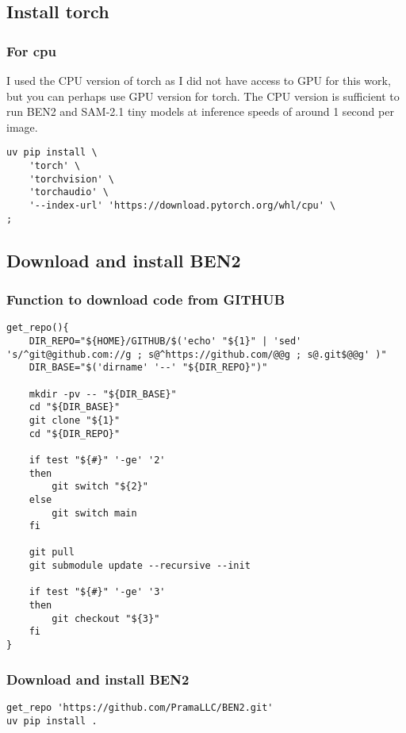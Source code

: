 \documentclass[11pt]{article}
\begin{document}
\subsection{Install torch}
\label{sec:orgc1575ae}

\subsubsection{For cpu}
\label{sec:org27c2f16}
I used the CPU version of torch as I did not have access to GPU for this work,
but you can perhaps use GPU version for torch.
The CPU version is sufficient to run BEN2 and SAM-2.1 tiny models
at inference speeds of around 1 second per image.

\begin{verbatim}
uv pip install \
    'torch' \
    'torchvision' \
    'torchaudio' \
    '--index-url' 'https://download.pytorch.org/whl/cpu' \
;
\end{verbatim}
\subsection{Download and install BEN2}
\label{sec:orgb4c2b05}

\subsubsection{Function to download code from GITHUB}
\label{sec:org7fef2b3}
\begin{verbatim}
get_repo(){
    DIR_REPO="${HOME}/GITHUB/$('echo' "${1}" | 'sed' 's/^git@github.com://g ; s@^https://github.com/@@g ; s@.git$@@g' )"
    DIR_BASE="$('dirname' '--' "${DIR_REPO}")"

    mkdir -pv -- "${DIR_BASE}"
    cd "${DIR_BASE}"
    git clone "${1}"
    cd "${DIR_REPO}"

    if test "${#}" '-ge' '2'
    then
        git switch "${2}"
    else
        git switch main
    fi

    git pull
    git submodule update --recursive --init

    if test "${#}" '-ge' '3'
    then
        git checkout "${3}"
    fi
}
\end{verbatim}
\subsubsection{Download and install BEN2}
\label{sec:orgbad30ee}
\begin{verbatim}
get_repo 'https://github.com/PramaLLC/BEN2.git'
uv pip install .
\end{verbatim}
\end{document}
